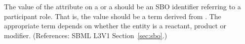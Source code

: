 The value of the  attribute on a \SpeciesReference or a
\ModifierSpeciesReference should be an SBO identifier referring to a
participant role.  That is, the value should be a term derived
from \sboparticipantrole.  The appropriate term depends on whether
the entity is a reactant, product or modifier.  (References: 
SBML L3V1 Section~\ref{sec:sbo}.)
